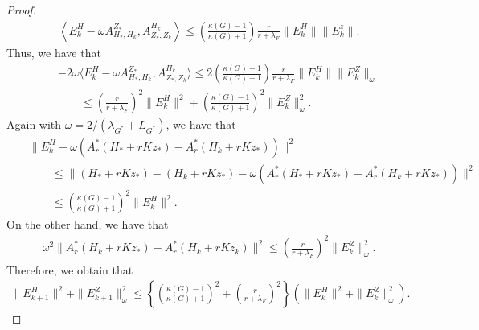 \begin{proof}
\begin{eqnarray*}
\left \langle E_k^H - \omega A_{H_*,H_k}^{Z_*}, A_{Z_*,Z_k}^{H_k} \right \rangle \leq \left ( \frac{\kappa(G) - 1}{\kappa(G) + 1} \right ) \frac{r}{r+\lambda_F} \|E_k^H\|\|E_k^z\|.  
\end{eqnarray*}
Thus, we have that 
\begin{eqnarray}\label{main:ineq}
&& - 2 \omega \langle E_k^H - \omega A_{H_*,H_k}^{Z_*}, A_{Z_*,Z_k}^{H_k} \rangle \leq 2 \left ( \frac{\kappa(G) - 1}{\kappa(G) + 1} \right ) \frac{r}{r+\lambda_F}  \|E_k^H\|\|E_k^Z\|_{\omega} \label{main:1eq} \\ 
&& \qquad \leq \left ( \frac{r}{r + \lambda_F} \right )^2 \|E_k^H\|^2 + \left ( \frac{\kappa(G) - 1}{\kappa(G) + 1} \right )^2 \|E_k^Z\|_{\omega}^2. \label{main:2eq}   
\end{eqnarray}
Again with $\omega = 2/(\lambda_{G^*} + L_{G^*})$, we have that 
\begin{eqnarray*}
&& \|E_k^H - \omega (A_r^{*} (H_* + rK z_*) - A_r^*(H_k + rKz_*))\|^2 \\  && \qquad \leq \|(H_* + rKz_*) - (H_k + rKz_*) - \omega (A_r^{*} (H_* + rK z_*) - A_r^*(H_k + rKz_*))\|^2 \\
&& \qquad \leq \left ( \frac{\kappa(G) - 1}{\kappa(G) + 1} \right )^2 \|E_k^H\|^2. 
\end{eqnarray*}
On the other hand, we have that 
\begin{eqnarray*}
\omega^2 \|A_r^*(H_k + r Kz_*) - A_r^{*} (H_k + r K z_k)\|^2 \leq \left ( \frac{r}{r+\lambda_F} \right )^2 \|E_k^Z\|_\omega^2. 
\end{eqnarray*}
Therefore, we obtain that 
\begin{eqnarray*}
\|E_{k+1}^H\|^2 + \|E_{k+1}^Z\|^2_{\omega} \leq \left \{ \left ( \frac{\kappa(G) - 1}{\kappa(G) + 1} \right )^2 + \left ( \frac{r}{r + \lambda_F} \right )^2 \right \} \left ( \|E_k^H\|^2 + \|E_k^Z\|^2_{\omega} \right ).  
\end{eqnarray*}
\begin{comment} 
By applying the simple long division, we obtain that 
\begin{eqnarray*}
\frac{(L_F - \lambda_F)^2 + r^2}{(r + \lambda_F)^2} = 1 + \frac{-2\lambda_F r -\lambda_F^2 + (L_F - \lambda_F)^2}{(r + \lambda_F)^2} = 1 - f(r), 
\end{eqnarray*}
where $f(r)$ is given as follows:
\begin{equation}
f(r) = \frac{2\lambda_F(r + L_F) - L_F^2}{(r + \lambda_F)^2}.
\end{equation} 
\begin{figure}[h]

\end{comment}
\end{proof}
